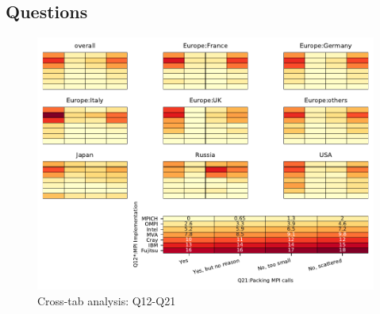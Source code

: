 
\subsection{Questions}


\begin{figure}
\begin{center}
\includegraphics[width=12cm]{../pdfs/Q12-Q21.pdf}
\caption{Cross-tab analysis: Q12-Q21}
\label{fig:Q12-Q21}
\end{center}
\end{figure}
